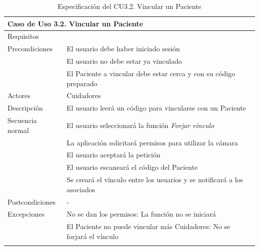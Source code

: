 \begin{longtable}{|p{} p{}|}
    \hline
    \multicolumn{2}{|l|}{\textbf{Caso de Uso 3.2. Vincular un Paciente}} \\ \hline \hline
    Requisitos          & {req:vinculo_cuidador} \\ \hline
    Precondiciones      & El usuario debe haber iniciado sesión \\
                        & El usuario no debe estar ya vinculado \\ 
                        & El Paciente a vincular debe estar cerca y con su código preparado \\ \hline
    Actores             & Cuidadores \\ \hline
    Descripción         & El usuario leerá un código para vincularse con un Paciente \\ \hline
    Secuencia normal    & El usuario seleccionará la función \emph{Forjar vínculo} \\
                        & La aplicación solicitará permisos para utilizar la cámara \\
                        & El usuario aceptará la petición \\
                        & El usuario escaneará el código del Paciente \\
                        & Se creará el vínculo entre los usuarios y se notificará a los asociados \\ \hline
    Postcondiciones     & - \\ \hline
    Excepciones         & No se dan los permisos: La función no se iniciará \\
                        & El Paciente no puede vincular más Cuidadores: No se forjará el vínculo \\ \hline
    \caption{Especificación del CU3.2. Vincular un Paciente}
    \label{cu:vincular_paciente}
\end{longtable}

